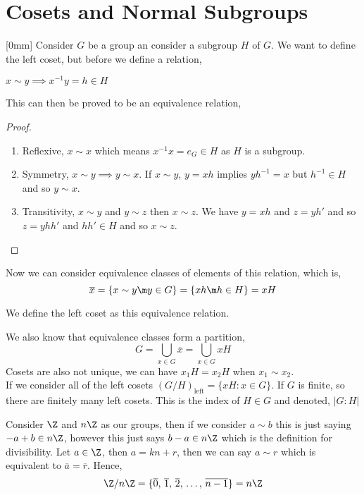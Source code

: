 \section{Cosets and Normal Subgroups}[0mm]
Consider $G$ be a group an consider a subgroup $H$ of $G$. We want to define the left coset, but before we define a relation,
\begin{ndefi}[Relation]
  $x \sim y \implies x^{-1}y = h\in H$
\end{ndefi}
This can then be proved to be an equivalence relation,
\begin{proof}
  \begin{enumerate}
    \item Reflexive, $x \sim x$ which means $x^{-1} x = e_G \in H$ as $H$ is a subgroup.
    \item Symmetry, $x \sim y \implies y \sim x$. If $x \sim y$, $y = xh$ implies $yh^{-1} = x$ but $h^{-1} \in H$ and so $y \sim x$.
    \item Transitivity, $x \sim y$ and $y \sim z$ then $x \sim z$. We have $y = xh$ and $z = yh'$ and so $z = yhh'$ and $hh' \in H$ and so $x \sim z$.
  \end{enumerate}
\end{proof}
Now we can consider equivalence classes of elements of this relation, which is,
$$ \overline{x} = \{x \sim y \m y \in G\} = \{xh \m h \in H\} = xH $$

\begin{ndefi}
  We define the left coset as this equivalence relation.
\end{ndefi}
We also know that equivalence classes form a partition,
$$ G = \bigcup_{x \in G}\overline{x} = \bigcup_{x \in G} xH $$
Cosets are also not unique, we can have $x_1H = x_2H$ when $x_1 \sim x_2$.\\

If we consider all of the left cosets $(G / H)_{\text{left}} = \{xH : x \in G\}$. If $G$ is finite, so there are finitely many left cosets. This is the index of $H \in G$ and denoted, $|G : H|$


\begin{eg}
  Consider $\Z$ and $n\Z$ as our groups, then if we consider $a \sim b$ this is just saying $-a + b \in n\Z$, however this just says $b - a \in n\Z$ which is the definition for divisibility. Let $a \in\Z$, then $a = kn + r$, then we can say $a \sim r$ which is equivalent to $\overline a = \overline r$. Hence,
  $$ \Z/n\Z = \{\overline 0,\, \overline 1,\, \overline 2,\, \dots ,\, \overline{n-1}\} = n\Z $$
\end{eg}

